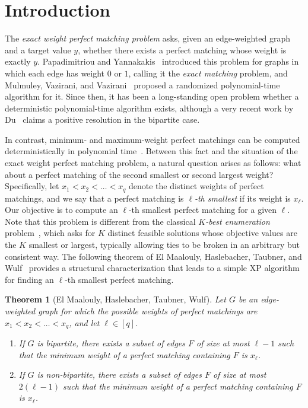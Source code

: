 \documentclass{article}
\theoremstyle{plain}
\newtheorem{thm}{Theorem}[section]
\theoremstyle{definition}
\begin{document}
\section{Introduction}
\label{sec:intro}


The \emph{exact weight perfect matching problem} asks, given an edge-weighted graph and a target value $y$, whether there exists a perfect matching whose weight is exactly $y$. Papadimitriou and Yannakakis~\cite{papadimitriou1982complexity} introduced this problem for graphs in which each edge has weight $0$ or $1$, calling it the \emph{exact matching} problem, and Mulmuley, Vazirani, and Vazirani~\cite{mulmuley1987matching} proposed a randomized polynomial-time algorithm for it. Since then, it has been a long-standing open problem whether a deterministic polynomial-time algorithm exists, although a very recent work by Du~\cite{du2026bipartite} claims a positive resolution in the bipartite case.

In contrast, minimum- and maximum-weight perfect matchings can be computed deterministically in polynomial time~\cite{edmonds1965maximum}. Between this fact and the situation of the exact weight perfect matching problem, a natural question arises as follows: what about a perfect matching of the second smallest or second largest weight? Specifically, let $x_1 < x_2 < \dots < x_q$ denote the distinct weights of perfect matchings, and we say that a perfect matching is \emph{$\ell$-th smallest} if its weight is $x_\ell$. Our objective is to compute an $\ell$-th smallest perfect matching for a given $\ell$. Note that this problem is different from the classical \emph{$K$-best enumeration} problem~\cite{lawler1972procedure}, which asks for $K$ distinct feasible solutions whose objective values are the $K$ smallest or largest, typically allowing ties to be broken in an arbitrary but consistent way. The following theorem of El Maalouly, Haslebacher, Taubner, and Wulf~\cite{maalouly2025finding} provides a structural characterization that leads to a simple XP algorithm for finding an $\ell$-th smallest perfect matching.

\begin{thm}[El Maalouly, Haslebacher, Taubner, Wulf]\label{thm:ESA2025}
    Let $G$ be an edge-weighted graph for which the possible weights of perfect matchings are $x_1 < x_2 < \dots < x_q$, and let $\ell\in[q]$.
    \begin{enumerate}[label=(\roman*)]\itemsep0em
        \item If $G$ is bipartite, there exists a subset of edges $F$ of size at most $\ell - 1$ such  that the minimum weight of a perfect matching containing $F$ is $x_\ell$.
        \item If $G$ is non-bipartite, there exists a subset of edges $F$ of size at most $2(\ell - 1)$ such that the minimum weight of a perfect matching containing $F$ is $x_\ell$.
    \end{enumerate}
\end{thm}
\end{document}
